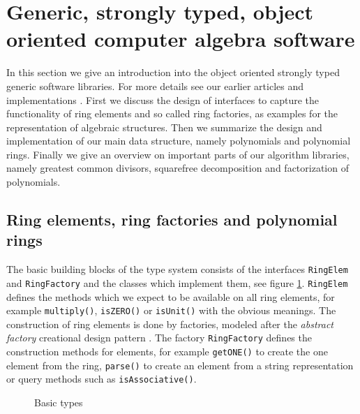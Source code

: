 \documentclass{llncs}
\newcommand{\code}[1]{\texttt{#1}}
\begin{document}
\section{Generic, strongly typed, object oriented computer algebra software} %
\label{sec:asto}

In this section we give an introduction into the object oriented
strongly typed generic software libraries. For more details see our
earlier articles and implementations
\cite{Kredel:2008,Jolly:2010,JollyKredel:2010,JollyKredel:2011,JollyKredel:2009,Kredel:2011}. %
%
First we discuss the design of interfaces to capture the functionality
of ring elements and so called ring factories, as examples for the
representation of algebraic structures. Then we summarize the design
and implementation of our main data structure, namely polynomials and
polynomial rings. Finally we give an overview on important parts of
our algorithm libraries, namely greatest common divisors, squarefree
decomposition and factorization of polynomials.


\subsection{Ring elements, ring factories and polynomial rings} %
\label{sec:ring}

The basic building blocks of the type system consists of the
interfaces \code{RingElem} and \code{RingFactory} and the classes
which implement them, see figure \ref{fig:bastype}. \code{RingElem}
defines the methods which we expect to be available on all ring
elements, for example \code{multiply()},
\code{isZERO()} or \code{isUnit()} with the obvious meanings. The
construction of ring elements is done by factories, modeled after the
{\em abstract factory} creational design pattern \cite{Gamma:1995}.
The factory \code{RingFactory} defines the construction methods for
elements, for example \code{get\-ONE()} to create the one element from
the ring, 
\code{parse()} to create an element from a string representation or query methods such as
\code{is\-Asso\-ciative()}. %

\begin{figure}[thb]
\centering
{}
\caption{Basic types}
\label{fig:bastype}
\end{figure}
\end{document}
